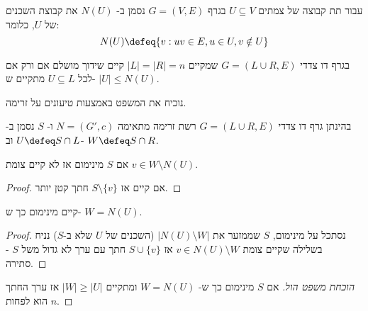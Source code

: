 עבור תת קבוצה של צמתים
$U \subseteq V$
בגרף 
$G = (V, E)$
נסמן ב-%
$N(U)$
את קבוצת השכנים של $U$, כלומר:
$$
N(U) \defeq \{v : uv \in E, u \in U, v \notin U\}
$$
\begin{theorem}
בגרף דו צדדי
$G = (L \cup R, E)$
שמקיים
$|L| = |R| = n$
קיים שידוך מושלם אם ורק אם לכל 
$U \subseteq L$
מתקיים ש-%
$|U| \leq N(U)$.
\end{theorem}

נוכיח את המשפט באמצעות טיעונים על זרימה.

בהינתן גרף דו צדדי 
$G = (L \cup R, E)$
רשת זרימה מתאימה
$N = (G', c)$
ו-%
\stcut{} $S$
נסמן ב-%
$U \defeq S \cap L$
וב-%
$W \defeq S \cap R$.

\begin{claim}
אם $S$ 
\stcut{}
מינימום אז לא קיים צומת 
$v \in W \setminus N(U)$.
\end{claim}

\begin{proof}
אם קיים אז 
$S \setminus \{v\}$
חתך קטן יותר.
\end{proof}

\begin{claim}
קיים
\stcut{}
מינימום כך ש-%
$W = N(U)$.
\end{claim}

\begin{proof}
נסתכל על
\stcut{}
מינימום,
$S$
שממזער את 
$|N(U) \setminus W|$
(השכנים של $U$ שלא ב-$S$)
נניח בשלילה שקיים צומת 
$v \in N(U) \setminus W$
אז 
$S \cup \{v\}$
חתך עם ערך לא גדול משל $S$ - סתירה.
\end{proof}

\begin{proof}[הוכחת משפט הול]
אם $S$
\stcut{}
מינימום כך ש-%
$W = N(U)$
ומתקיים 
$|W| \geq |U|$
אז ערך החתך הוא לפחות $n$.
\end{proof}

